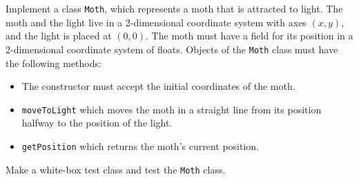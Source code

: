 Implement a class \lstinline{Moth}, which represents a moth that is attracted to light. The moth and the light live in a 2-dimensional coordinate system with axes $(x,y)$, and the light is placed at $(0,0)$. The moth must have a field for its position in a 2-dimensional coordinate system of floats. Objects of the \lstinline{Moth} class must have the following methods:
\begin{itemize}
\item The constructor must accept the initial coordinates of the moth.
\item \lstinline{moveToLight} which moves the moth in a straight line from its position halfway to the position of the light.
\item \lstinline{getPosition} which returns the moth's current position.
\end{itemize}
Make a white-box test class and test the \lstinline{Moth} class.
